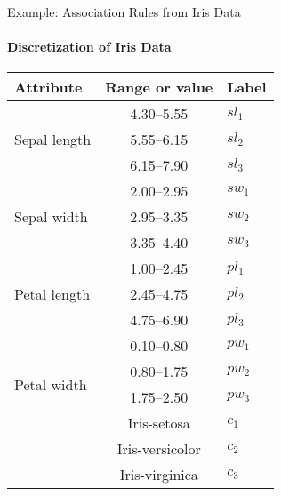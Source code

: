 \begin{frame}{Example: Association Rules from Iris Data}
\framesubtitle{Discretization of Iris Data}
\begin{center}
\begin{tabular}{|l|c|l|}
\hline
Attribute & Range or value & Label \\ \hline
\multirow{3}{*}{Sepal length} & 4.30--5.55 & $sl_1$ \\
& 5.55--6.15 & $sl_2$ \\
& 6.15--7.90 & $sl_3$ \\ \hline
\multirow{3}{*}{Sepal width}  & 2.00--2.95 & $sw_1$ \\
& 2.95--3.35 & $sw_2$ \\
& 3.35--4.40 & $sw_3$ \\ \hline
\multirow{3}{*}{Petal length} & 1.00--2.45 & $pl_1$ \\
& 2.45--4.75 & $pl_2$ \\
& 4.75--6.90 & $pl_3$ \\ \hline
\multirow{4}{*}{Petal width}  & 0.10--0.80 & $pw_1$ \\
& 0.80--1.75 & $pw_2$ \\
& 1.75--2.50 & $pw_3$ \\ \hline
\multirow{3}{*}{Class} & Iris-setosa  & $c_1$ \\
& Iris-versicolor  & $c_2$ \\
& Iris-virginica  & $c_3$ \\ \hline
\end{tabular}%
\end{center}
\end{frame}
  

